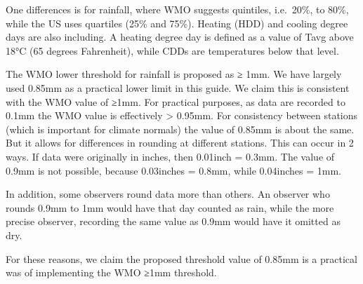 \documentclass[
  letterpaper,
  DIV=11,
  numbers=noendperiod]{scrreprt}
\begin{document}
One differences is for rainfall, where WMO suggests quintiles,
i.e.~20\%, to 80\%, while the US uses quartiles (25\% and 75\%). Heating
(HDD) and cooling degree days are also including. A heating degree day
is defined as a value of Tavg above 18°C (65 degrees Fahrenheit), while
CDDs are temperatures below that level.

The WMO lower threshold for rainfall is proposed as ≥ 1mm. We have
largely used 0.85mm as a practical lower limit in this guide. We claim
this is consistent with the WMO value of ≥1mm. For practical purposes,
as data are recorded to 0.1mm the WMO value is effectively
\textgreater{} 0.95mm. For consistency between stations (which is
important for climate normals) the value of 0.85mm is about the same.
But it allows for differences in rounding at different stations. This
can occur in 2 ways. If data were originally in inches, then 0.01inch =
0.3mm. The value of 0.9mm is not possible, because 0.03inches = 0.8mm,
while 0.04inches = 1mm.

In addition, some observers round data more than others. An observer who
rounds 0.9mm to 1mm would have that day counted as rain, while the more
precise observer, recording the same value as 0.9mm would have it
omitted as dry.

For these reasons, we claim the proposed threshold value of 0.85mm is a
practical was of implementing the WMO ≥1mm threshold.
\end{document}
